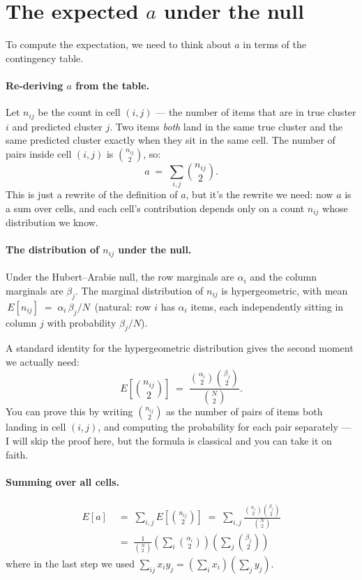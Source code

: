 \documentclass[11pt]{article}
\begin{document}
\section{The expected $a$ under the null}

To compute the expectation, we need to think about $a$ in terms of the
contingency table.

\paragraph{Re-deriving $a$ from the table.}
Let $n_{ij}$ be the count in cell $(i, j)$ --- the number of items that
are in true cluster $i$ and predicted cluster $j$. Two items
\emph{both} land in the same true cluster and the same predicted cluster
exactly when they sit in the same cell. The number of pairs inside cell
$(i,j)$ is $\binom{n_{ij}}{2}$, so:
\[
  a \;=\; \sum_{i, j} \binom{n_{ij}}{2}.
\]
This is just a rewrite of the definition of $a$, but it's the rewrite we
need: now $a$ is a sum over cells, and each cell's contribution depends
only on a count $n_{ij}$ whose distribution we know.

\paragraph{The distribution of $n_{ij}$ under the null.}
Under the Hubert--Arabie null, the row marginals are $\alpha_i$ and the
column marginals are $\beta_j$. The marginal distribution of $n_{ij}$ is
hypergeometric, with mean
$\,E[n_{ij}] \;=\; \alpha_i \, \beta_j / N\,$
(natural: row $i$ has $\alpha_i$ items, each independently sitting in
column $j$ with probability $\beta_j / N$).

A standard identity for the hypergeometric distribution gives the second
moment we actually need:
\[
  E\!\left[\binom{n_{ij}}{2}\right]
  \;=\; \frac{\binom{\alpha_i}{2}\binom{\beta_j}{2}}{\binom{N}{2}}.
\]
You can prove this by writing $\binom{n_{ij}}{2}$ as the number of pairs
of items both landing in cell $(i, j)$, and computing the probability for
each pair separately --- I will skip the proof here, but the formula is
classical and you can take it on faith.

\paragraph{Summing over all cells.}
\begin{align*}
  E[a] \;&=\; \sum_{i, j} E\!\left[\binom{n_{ij}}{2}\right]
       \;=\; \sum_{i, j} \frac{\binom{\alpha_i}{2}\binom{\beta_j}{2}}{\binom{N}{2}} \\
       \;&=\; \frac{1}{\binom{N}{2}} \left(\sum_i \binom{\alpha_i}{2}\right)
                                     \left(\sum_j \binom{\beta_j}{2}\right)
\end{align*}
where in the last step we used $\sum_{ij} x_i y_j = (\sum_i x_i)(\sum_j y_j)$.
\end{document}
